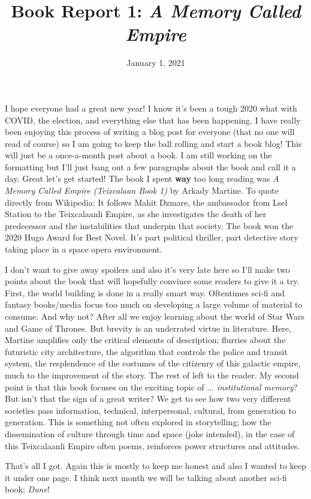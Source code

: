 \documentclass[12pt]{article}
\title{\vspace{-20mm} \textbf{Book Report 1: \emph{A Memory Called Empire}}}
\begin{document}
\date{January 1, 2021}
\maketitle
\thispagestyle{empty} %

I hope everyone had a great new year! I know it's been a tough 2020 what with COVID, the election, and everything else that has been happening. I have really been enjoying this process of writing a blog post for everyone (that no one will read of course) so I am going to keep the ball rolling and start a book blog! This will just be a once-a-month post about a book. I am still working on the formatting but I'll just bang out a few paragraphs about the book and call it a day. Great let's get started! The book I spent \textbf{way} too long reading was \emph{A Memory Called Empire (Teixcalaan Book 1)} by Arkady Martine. To quote directly from Wikipedia: It follows Mahit Dzmare, the ambassador from Lsel Station to the Teixcalaanli Empire, as she investigates the death of her predecessor and the instabilities that underpin that society. The book won the 2020 Hugo Award for Best Novel. It's part political thriller, part detective story taking place in a space opera environment. 

\vspace{5mm}

I don't want to give away spoilers and also it's very late here so I'll make two points about the book that will hopefully convince some readers to give it a try. First, the world building is done in a really smart way. Oftentimes sci-fi and fantasy books/media focus too much on developing a large volume of material to consume. And why not? After all we enjoy learning about the world of Star Wars and Game of Thrones. But brevity is an underrated virtue in literature. Here, Martine amplifies only the critical elements of description; flurries about the futuristic city architecture, the algorithm that controls the police and transit system, the resplendence of the costumes of the citizenry of this galactic empire, much to the improvement of the story. The rest of left to the reader. My second point is that this book focuses on the exciting topic of ... \emph{institutional memory}? But isn't that the sign of a great writer? We get to see how two very different societies pass information, technical, interpersonal, cultural, from generation to generation. This is something not often explored in storytelling; how the dissemination of culture through time and space (joke intended), in the case of this Teixcalaanli Empire often poems, reinforces power structures and attitudes. 

\vspace{5mm}

That's all I got. Again this is mostly to keep me honest and also I wanted to keep it under one page. I think next month we will be talking about another sci-fi book; \emph{Dune}!
\end{document}
